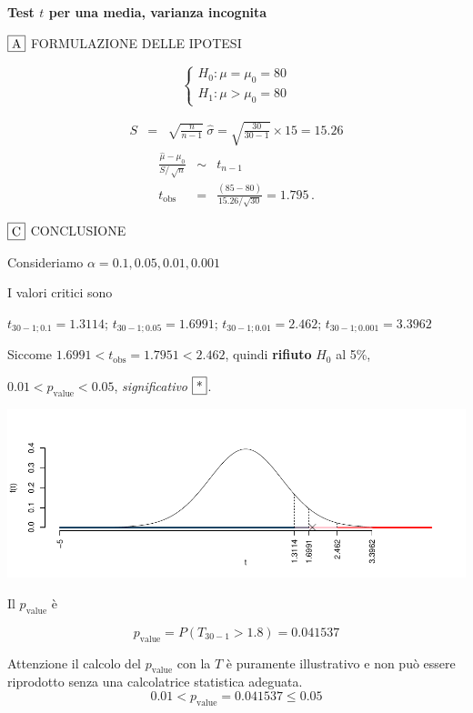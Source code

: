 \documentclass[
  11pt,
]{book}
\theoremstyle{mytheoremstyle}
\theoremstyle{mydefstyle}
\newenvironment{sol}
  {
  \begin{tcolorbox}[enhanced,breakable,arc=0.1mm,boxrule=1pt,colback=white,colframe=iblue,
  title=\bf \fontfamily{lmss}\selectfont \hspace{.5 cm} Soluzione,drop fuzzy shadow]

}{
\end{tcolorbox}
  }
\begin{document}
\begin{sol}
\textbf{Test \(t\) per una media, varianza incognita}

\(\fbox{A}\) FORMULAZIONE DELLE IPOTESI

\[\begin{cases}
   H_0: \mu = \mu_0=80 \\
   H_1: \mu > \mu_0=80 
   \end{cases}\]

\begin{eqnarray*}
   S    &=& \sqrt{\frac{n} {n-1}}\ \widehat{\sigma} 
   =  \sqrt{\frac{ 30 } { 30 -1}} \times  15  =  15.26 
   \end{eqnarray*}
\begin{eqnarray*}
   \frac{\hat\mu - \mu_{0}} {S/\,\sqrt{n}}&\sim&t_{n-1}\\
   t_{\text{obs}}
   &=& \frac{ ( 85 -  80 )} { 15.26 /\sqrt{ 30 }}
   =   1.795 \, .
   \end{eqnarray*}

\(\fbox{C}\) CONCLUSIONE

Consideriamo \(\alpha=0.1, 0.05, 0.01, 0.001\)

I valori critici sono

\(t_{30-1;0.1}=1.3114\); \(t_{30-1;0.05}=1.6991\); \(t_{30-1;0.01}=2.462\); \(t_{30-1;0.001}=3.3962\)

Siccome \(1.6991<t_\text{obs}=1.7951<2.462\), quindi \textbf{rifiuto} \(H_0\) al 5\%,

\(0.01<p_\text{value}<0.05\), \emph{significativo} \(\fbox{*}\).

\begin{center}\includegraphics{Esami_passati_con_soluzioni_files/figure-latex/05-test-10,-1} \end{center}

Il \(p_{\text{value}}\) è

\[ p_{\text{value}} = P(T_{30-1}>1.8)=0.041537 \]

Attenzione il calcolo del \(p_\text{value}\) con la \(T\) è puramente illustrativo e non può essere riprodotto senza una calcolatrice statistica adeguata.\[
 0.01 < p_\text{value}= 0.041537 \leq 0.05 
\]

\end{sol}
\end{document}

